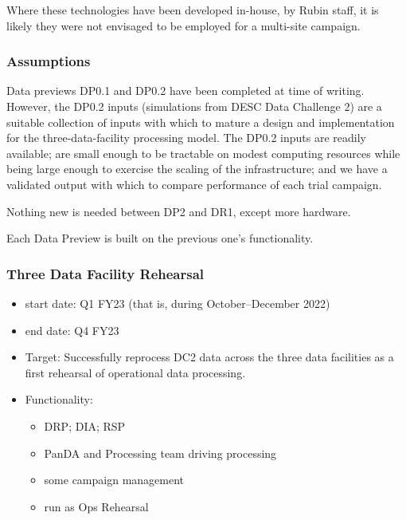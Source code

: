 Where these technologies have been developed in-house, by Rubin staff, it is likely they were not envisaged to be employed for a multi-site campaign.


\subsubsection{Assumptions}

Data previews DP0.1 and DP0.2 have been completed at time of writing. However, the DP0.2 inputs (simulations from DESC Data Challenge 2) are a suitable collection of inputs with which to mature a design and implementation for the three-data-facility processing model. The DP0.2 inputs are readily available; are small enough to be tractable on modest computing resources while being large enough to exercise the scaling of the infrastructure; and we have a validated output with which to compare performance of each trial campaign.

Nothing new is needed between \gls{DP2} and \gls{DR1}, except more
hardware.

Each Data Preview is built on the previous one's functionality.

\subsubsection{Three Data Facility Rehearsal}

\begin{itemize}

\item start date: Q1 \gls{FY23} (that is, during October--December 2022)

\item end date: Q4 \gls{FY23}

\item Target: Successfully reprocess \gls{DC2} data across the three data facilities as a first rehearsal of operational data processing.

\item Functionality:

  \begin{itemize}
    
  \item \gls{DRP}; \gls{DIA}; \gls{RSP}

  \item \gls{PanDA} and Processing team driving processing

  \item some campaign management

  \item run as Ops Rehearsal

  \end{itemize}
  
\end{itemize}

